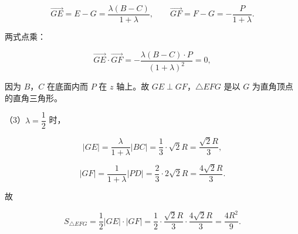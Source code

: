 \begin{answer}
\nopagebreak[4]
\[\overrightarrow{GE}=E-G=\frac{\lambda(B-C)}{1+\lambda},\qquad \overrightarrow{GF}=F-G=-\frac{P}{1+\lambda}.\]

两式点乘：

\nopagebreak[4]
\[\overrightarrow{GE}\cdot\overrightarrow{GF}=-\frac{\lambda(B-C)\cdot P}{(1+\lambda)^2}=0,\]

因为 $B$，$C$ 在底面内而 $P$ 在 $z$ 轴上。故 $GE\perp GF$，$\triangle EFG$ 是以 $G$ 为直角顶点的直角三角形。

（3）$\lambda=\dfrac12$ 时，

\nopagebreak[4]
\[|GE|=\frac{\lambda}{1+\lambda}|BC|=\frac13\cdot\sqrt2R=\frac{\sqrt2R}3,\]

\nopagebreak[4]
\[|GF|=\frac1{1+\lambda}|PD|=\frac23\cdot2\sqrt2R=\frac{4\sqrt2R}3.\]

故

\nopagebreak[4]
\[S_{\triangle EFG}=\frac12|GE|\cdot|GF|=\frac12\cdot\frac{\sqrt2R}3\cdot\frac{4\sqrt2R}3=\frac{4R^2}9.\]


\end{answer}
